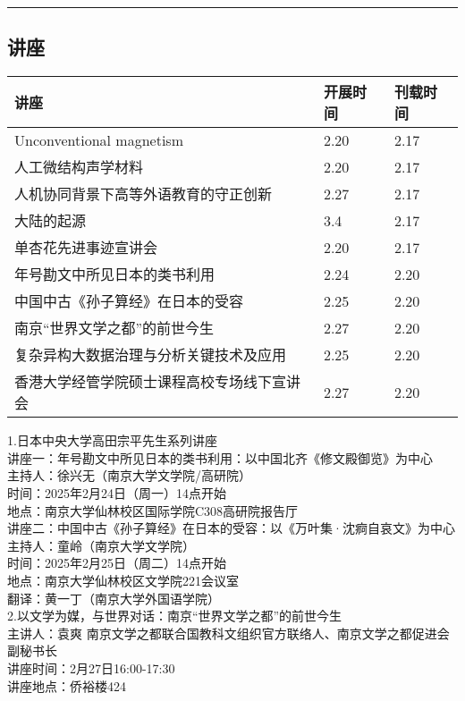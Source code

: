 \documentclass[letterpaper, 12pt]{article}
\begin{document}
\hrule
\pagebreak
\begin{multicols}{2}

\section{讲座}
\begin{tabularx}{0.5\textwidth}{|X|X|X|}
    \hline
    讲座 & 开展时间 & 刊载时间\\
    \hline\hline
    Unconventional magnetism & 2.20 & 2.17\\\hline
    人工微结构声学材料 & 2.20 & 2.17\\\hline
    人机协同背景下高等外语教育的守正创新 & 2.27 & 2.17\\\hline
    大陆的起源 & 3.4 & 2.17\\\hline
    单杏花先进事迹宣讲会 & 2.20 & 2.17\\\hline
    年号勘文中所见日本的类书利用 & 2.24 & 2.20\\\hline
    中国中古《孙子算经》在日本的受容 & 2.25 & 2.20\\\hline
    南京“世界文学之都”的前世今生 & 2.27 & 2.20\\\hline
    复杂异构大数据治理与分析关键技术及应用 & 2.25 & 2.20\\\hline
    香港大学经管学院硕士课程高校专场线下宣讲会 & 2.27 & 2.20\\\hline
\end{tabularx}
1.日本中央大学高田宗平先生系列讲座\\
讲座一：年号勘文中所见日本的类书利用：以中国北齐《修文殿御览》为中心\\
主持人：徐兴无（南京大学文学院/高研院）\\
时间：2025年2月24日（周一）14点开始 \\
地点：南京大学仙林校区国际学院C308高研院报告厅\\
讲座二：中国中古《孙子算经》在日本的受容：以《万叶集·沈痾自哀文》为中心\\
主持人：童岭（南京大学文学院）\\
时间：2025年2月25日（周二）14点开始\\
地点：南京大学仙林校区文学院221会议室\\
翻译：黄一丁（南京大学外国语学院）\\

2.以文学为媒，与世界对话：南京“世界文学之都”的前世今生\\
主讲人：袁爽 南京文学之都联合国教科文组织官方联络人、南京文学之都促进会副秘书长\\
讲座时间：2月27日16:00-17:30\\
讲座地点：侨裕楼424\\


\end{multicols}
\end{document}
